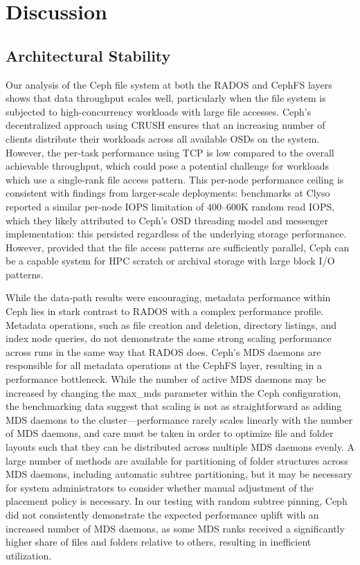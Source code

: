 \pagebreak
\section{Discussion}
\label{sec:discussion}

\subsection{Architectural Stability}

Our analysis of the Ceph file system at both the \ac{RADOS} and \ac{CephFS} layers shows that data throughput scales well, particularly when the file system is subjected to high-concurrency workloads with large file accesses. Ceph's decentralized approach using \ac{CRUSH} ensures that an increasing number of clients distribute their workloads across all available \acp{OSD} on the system. However, the per-task performance using \ac{TCP} is low compared to the overall achievable throughput, which could pose a potential challenge for workloads which use a single-rank file access pattern. This per-node performance ceiling is consistent with findings from larger-scale deployments: benchmarks at Clyso~\cite{ceph-1tib} reported a similar per-node \ac{IOPS} limitation of 400--600K random read \ac{IOPS}, which they likely attributed to Ceph's \ac{OSD} threading model and messenger implementation: this persisted regardless of the underlying storage performance. However, provided that the file access patterns are sufficiently parallel, Ceph can be a capable system for \ac{HPC} scratch or archival storage with large block \ac{I/O} patterns.

While the data-path results were encouraging, metadata performance within Ceph lies in stark contrast to \ac{RADOS} with a complex performance profile. Metadata operations, such as file creation and deletion, directory listings, and index node queries, do not demonstrate the same strong scaling performance across runs in the same way that \ac{RADOS} does. Ceph's \ac{MDS} daemons are responsible for all metadata operations at the \ac{CephFS} layer, resulting in a performance bottleneck. While the number of active \ac{MDS} daemons may be increased by changing the max\_mds parameter within the Ceph configuration, the benchmarking data suggest that scaling is not as straightforward as adding \ac{MDS} daemons to the cluster---performance rarely scales linearly with the number of \ac{MDS} daemons, and care must be taken in order to optimize file and folder layouts such that they can be distributed across multiple \ac{MDS} daemons evenly. A large number of methods are available for partitioning of folder structures across \ac{MDS} daemons, including automatic subtree partitioning, but it may be necessary for system administrators to consider whether manual adjustment of the placement policy is necessary. In our testing with random subtree pinning, Ceph did not consistently demonstrate the expected performance uplift with an increased number of \ac{MDS} daemons, as some \ac{MDS} ranks received a significantly higher share of files and folders relative to others, resulting in inefficient utilization.

